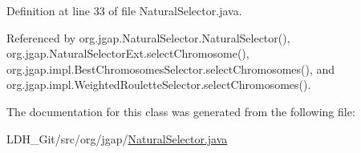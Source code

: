 Definition at line 33 of file Natural\-Selector.\-java.



Referenced by org.\-jgap.\-Natural\-Selector.\-Natural\-Selector(), org.\-jgap.\-Natural\-Selector\-Ext.\-select\-Chromosome(), org.\-jgap.\-impl.\-Best\-Chromosomes\-Selector.\-select\-Chromosomes(), and org.\-jgap.\-impl.\-Weighted\-Roulette\-Selector.\-select\-Chromosomes().



The documentation for this class was generated from the following file\-:\begin{DoxyCompactItemize}
\item 
L\-D\-H\-\_\-\-Git/src/org/jgap/\hyperlink{_natural_selector_8java}{Natural\-Selector.\-java}\end{DoxyCompactItemize}
